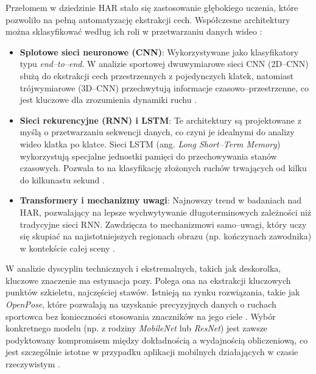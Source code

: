         Przełomem w dziedzinie HAR stało się zastosowanie głębokiego uczenia, które pozwoliło na pełną automatyzację ekstrakcji cech. Współczesne architektury można sklasyfikować według ich roli w przetwarzaniu danych wideo \cite{host2022overview}:
        \begin{itemize}
            \item \textbf{Splotowe sieci neuronowe (CNN)}: Wykorzystywane jako klasyfikatory typu \textit{end–to–end}. W analizie sportowej dwuwymiarowe sieci CNN (2D–CNN) służą do ekstrakcji cech przestrzennych z pojedynczych klatek, natomiast trójwymiarowe (3D–CNN) przechwytują informacje czasowo–przestrzenne, co jest kluczowe dla zrozumienia dynamiki ruchu \cite{host2022overview}.
            \item \textbf{Sieci rekurencyjne (RNN) i LSTM}: Te architektury są projektowane z myślą o przetwarzaniu sekwencji danych, co czyni je idealnymi do analizy wideo klatka po klatce. Sieci LSTM (ang. \textit{Long Short–Term Memory}) wykorzystują specjalne jednostki pamięci do przechowywania stanów czasowych. Pozwala to na klasyfikację złożonych ruchów trwających od kilku do kilkunastu sekund \cite{host2022overview}.
            \item \textbf{Transformery i mechanizmy uwagi}: Najnowszy trend w badaniach nad HAR, pozwalający na lepsze wychwytywanie długoterminowych zależności niż tradycyjne sieci RNN. Zawdzięcza to mechanizmowi samo–uwagi, który uczy się skupiać na najistotniejszych regionach obrazu (np. kończynach zawodnika) w kontekście całej sceny \cite{host2022overview}.
        \end{itemize}

        W analizie dyscyplin technicznych i ekstremalnych, takich jak deskorolka, kluczowe znaczenie ma estymacja pozy. Polega ona na ekstrakcji kluczowych punktów szkieletu, najczęściej stawów. Istnieją na rynku rozwiązania, takie jak \textit{OpenPose}, które pozwalają na uzyskanie precyzyjnych danych o ruchach sportowca bez konieczności stosowania znaczników na jego ciele \cite{openpose2025}. Wybór konkretnego modelu (np. z rodziny \textit{MobileNet} lub \textit{ResNet}) jest zawsze podyktowany kompromisem między dokładnością a wydajnością obliczeniową, co jest szczególnie istotne w przypadku aplikacji mobilnych działających w czasie rzeczywistym \cite{host2022overview}. 

